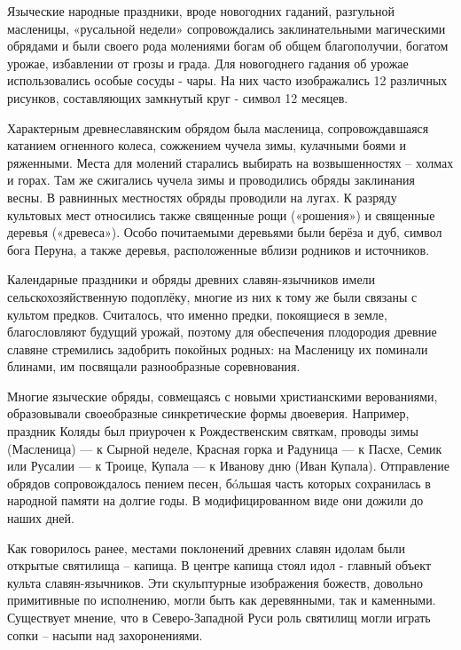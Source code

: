 \documentclass[a4paper, 12pt]{report}
\begin{document}
Языческие народные праздники, вроде новогодних гаданий,
разгульной масленицы, «русальной недели» сопровождались
заклинательными магическими обрядами и были своего рода молениями
богам об общем благополучии, богатом урожае, избавлении от грозы и
града. Для новогоднего гадания об урожае использовались особые сосуды -
чары. На них часто изображались 12 различных рисунков, составляющих
замкнутый круг - символ 12 месяцев.

Характерным древнеславянским обрядом была масленица, сопровождавшаяся катанием огненного колеса, сожжением чучела зимы, кулачными боями и ряженными. Места для молений старались выбирать на возвышенностях – холмах и горах. Там же сжигались чучела зимы и проводились обряды заклинания весны. В равнинных местностях обряды проводили на лугах. К разряду культовых мест относились также священные рощи («рошения») и священные деревья («древеса»). Особо почитаемыми деревьями были берёза и дуб, символ бога Перуна, а также деревья, расположенные вблизи родников и источников.

Календарные праздники и обряды древних славян-язычников имели сельскохозяйственную подоплёку, многие из них к тому же были связаны с культом предков. Считалось, что именно предки, покоящиеся в земле, благословляют будущий урожай, поэтому для обеспечения плодородия древние славяне стремились задобрить покойных родных: на Масленицу их поминали блинами, им посвящали разнообразные соревнования.

Многие языческие обряды, совмещаясь с новыми христианскими верованиями, образовывали своеобразные синкретические формы двоеверия. Например, праздник Коляды был приурочен к Рождественским святкам, проводы зимы (Масленица) — к Сырной неделе, Красная горка и Радуница — к Пасхе, Семик или Русалии — к Троице, Купала — к Иванову дню (Иван Купала). Отправление обрядов сопровождалось пением песен, бóльшая часть которых сохранилась в народной памяти на долгие годы. В модифицированном виде они дожили до наших дней.

Как говорилось ранее, местами поклонений древних славян идолам были открытые святилища – капища. В центре капища стоял идол - главный объект культа славян-язычников. Эти скульптурные изображения божеств, довольно примитивные по исполнению, могли быть как деревянными, так и каменными. Существует мнение, что в Северо-Западной Руси роль святилищ могли играть сопки – насыпи над захоронениями.
\end{document}
